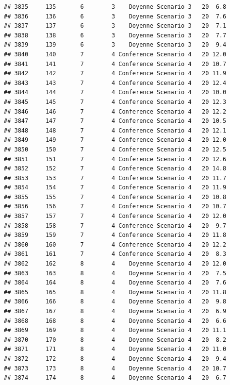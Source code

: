 \documentclass[
]{article}
\begin{document}
\begin{verbatim}
## 3835     135       6        3    Doyenne Scenario 3   20  6.8
## 3836     136       6        3    Doyenne Scenario 3   20  7.6
## 3837     137       6        3    Doyenne Scenario 3   20  7.1
## 3838     138       6        3    Doyenne Scenario 3   20  7.7
## 3839     139       6        3    Doyenne Scenario 3   20  9.4
## 3840     140       7        4 Conference Scenario 4   20 12.0
## 3841     141       7        4 Conference Scenario 4   20 10.7
## 3842     142       7        4 Conference Scenario 4   20 11.9
## 3843     143       7        4 Conference Scenario 4   20 12.4
## 3844     144       7        4 Conference Scenario 4   20 10.0
## 3845     145       7        4 Conference Scenario 4   20 12.3
## 3846     146       7        4 Conference Scenario 4   20 12.2
## 3847     147       7        4 Conference Scenario 4   20 10.5
## 3848     148       7        4 Conference Scenario 4   20 12.1
## 3849     149       7        4 Conference Scenario 4   20 12.0
## 3850     150       7        4 Conference Scenario 4   20 12.5
## 3851     151       7        4 Conference Scenario 4   20 12.6
## 3852     152       7        4 Conference Scenario 4   20 14.8
## 3853     153       7        4 Conference Scenario 4   20 11.7
## 3854     154       7        4 Conference Scenario 4   20 11.9
## 3855     155       7        4 Conference Scenario 4   20 10.8
## 3856     156       7        4 Conference Scenario 4   20 10.7
## 3857     157       7        4 Conference Scenario 4   20 12.0
## 3858     158       7        4 Conference Scenario 4   20  9.7
## 3859     159       7        4 Conference Scenario 4   20 11.8
## 3860     160       7        4 Conference Scenario 4   20 12.2
## 3861     161       7        4 Conference Scenario 4   20  8.3
## 3862     162       8        4    Doyenne Scenario 4   20 12.0
## 3863     163       8        4    Doyenne Scenario 4   20  7.5
## 3864     164       8        4    Doyenne Scenario 4   20  7.6
## 3865     165       8        4    Doyenne Scenario 4   20 11.8
## 3866     166       8        4    Doyenne Scenario 4   20  9.8
## 3867     167       8        4    Doyenne Scenario 4   20  6.9
## 3868     168       8        4    Doyenne Scenario 4   20  6.6
## 3869     169       8        4    Doyenne Scenario 4   20 11.1
## 3870     170       8        4    Doyenne Scenario 4   20  8.2
## 3871     171       8        4    Doyenne Scenario 4   20 11.0
## 3872     172       8        4    Doyenne Scenario 4   20  9.4
## 3873     173       8        4    Doyenne Scenario 4   20 10.7
## 3874     174       8        4    Doyenne Scenario 4   20  6.7

\end{verbatim}
\end{document}
